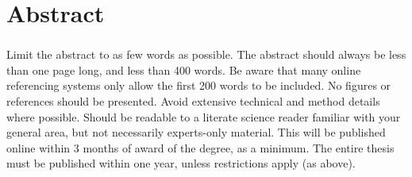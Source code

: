 \chapter*{Abstract} 
\subsection*{\thesistitle}

Limit the abstract to as few words as possible.  The abstract should always be less than one page long, and less than 400 words.  Be aware that many online referencing systems only allow the first 200 words to be included.  No figures or references should be presented. Avoid extensive technical and method details where possible.  Should be readable to a literate science reader familiar with your general area, but not necessarily experts-only material. This will be published online within 3 months of award of the degree, as a minimum.  The entire thesis must be published within one year, unless restrictions apply (as above).
